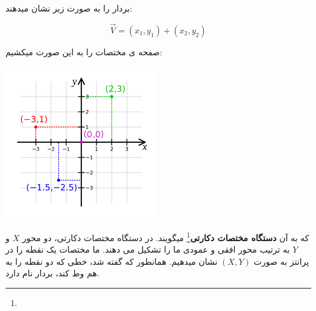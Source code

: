 \documentclass[14pt,a4paper]{memoir}
\begin{document}
بردار را به صورت زیر نشان میدهند:

\[ \vec{V} = (x_1, y_1) + (x_2, y_2) \]
	 
	 صفحه ی مختصات را به این صورت میکشیم: \vfill
	 \begin{center}
	 	\includegraphics*[scale = 1]{coordinate_system}
	 \end{center}
	 
	 که به آن \textbf{دستگاه مختصات دکارتی}\footnote{} میگویند. در دستگاه مختصات دکارتی، دو محور $ X $ و $ Y $ به ترتیب محور افقی و عمودی ما را تشکیل می دهند. ما مختصات یک نقطه را در پرانتز به صورت $ (X, Y) $ نشان میدهیم. همانطور که گفته شد، خطی که دو نقطه را به هم وط کند، بردار نام دارد.
	 
\end{document}
